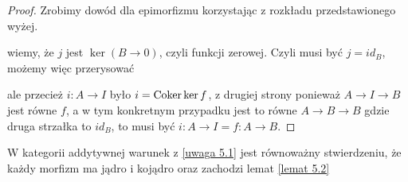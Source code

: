 \begin{proof}
  Zrobimy dowód dla epimorfizmu korzystając z rozkładu przedstawionego wyżej.

  \begin{center}\end{center}
  
  wiemy, że $j$ jest $\ker(B\to 0)$, czyli funkcji zerowej. Czyli musi być $j=id_B$, możemy więc przerysować

  \begin{center}\end{center}
  ale przecież $i:A\to I$ było $i=\operatorname{Coker}\ker f$, z drugiej strony ponieważ $A\to I\to B$ jest równe $f$, a w tym konkretnym przypadku jest to równe $A\to B\to B$ gdzie druga strzałka to $id_B$, to musi być $i:A\to I=f:A\to B$.
\end{proof}

\begin{uwaga}
  W kategorii addytywnej warunek z \ref{uwaga 5.1} jest równoważny stwierdzeniu, że każdy morfizm ma jądro i kojądro oraz zachodzi lemat \ref{lemat 5.2}
\end{uwaga}


